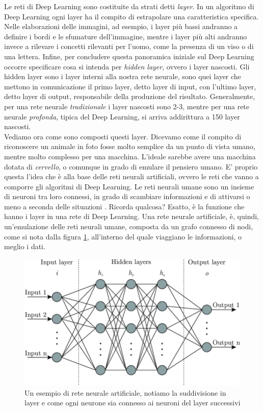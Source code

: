 Le reti di Deep Learning sono costituite da strati detti \emph{layer}. In un algoritmo di Deep Learning ogni layer ha il compito di estrapolare una caratteristica specifica. Nelle elaborazioni delle immagini, ad esempio, i layer più bassi andranno a definire i bordi e le sfumature dell'immagine, mentre i layer più alti andranno invece a rilevare i concetti rilevanti per l'uomo, come la presenza di un viso o di una lettera.
Infine, per concludere questa panoramica iniziale sul Deep Learning occorre specificare cosa si intenda per \emph{hidden layer}, ovvero i layer nascosti. Gli hidden layer sono i layer interni alla nostra rete neurale, sono quei layer che mettono in comunicazione il primo layer, detto layer di input, con l'ultimo layer, detto layer di output, responsabile della produzione del risultato. Generalmente, per una rete neurale \emph{tradizionale} i layer nascosti sono 2-3, mentre per una rete neurale \emph{profonda}, tipica del Deep Learning, si arriva addirittura a 150 layer nascosti.
\\Vediamo ora come sono composti questi layer. Dicevamo come il compito di riconoscere un animale in foto fosse molto semplice da un punto di vista umano, mentre molto complesso per una macchina. L'ideale sarebbe avere una macchina dotata di \emph{cervello}, o comunque in grado di emulare il pensiero umano. E' proprio questa l'idea che è alla base delle reti neurali artificiali, ovvero le reti che vanno a comporre gli algoritmi di Deep Learning.
Le reti neurali umane sono un insieme di neuroni tra loro connessi, in grado di scambiare informazioni e di attivarsi o meno a seconda delle situazioni \cite{mehrotra1997elements}. Ricorda qualcosa? Esatto, è la funzione che hanno i layer in una rete di Deep Learning. Una rete neurale artificiale, è, quindi, un'emulazione delle reti neurali umane, composta da un grafo connesso di nodi, come si nota dalla figura \ref{fig:Artificial Neural Network}, all'interno del quale viaggiano le informazioni, o meglio i dati.

\begin{figure}[H]
  \begin{center}
    \includegraphics[width=0.8\columnwidth]{images/Artificial-neural-network-architecture-ANN-i-h-1-h-2-h-n-o.png}
  \end{center}
  \caption{Un esempio di rete neurale artificiale, notiamo la suddivisione in layer e come ogni neurone sia connesso ai neuroni del layer successivi}
  \label{fig:Artificial Neural Network}
\end{figure}

